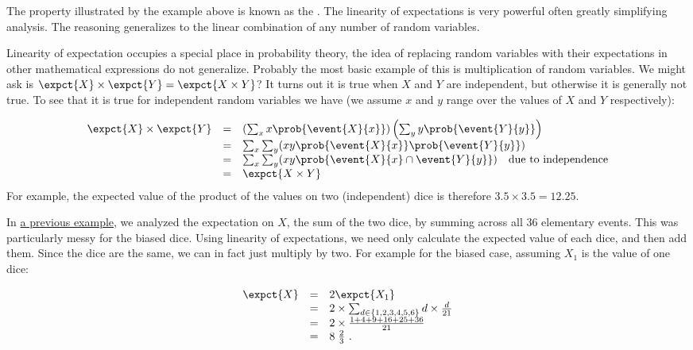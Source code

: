 \begin{flex}
\label{grp:grm:probability::expectation::property}

\begin{gram}
\label{grm:probability::expectation::property}
The property illustrated by the example above is known as the .
The linearity of expectations is very powerful often greatly simplifying
analysis.
The reasoning generalizes to the linear combination of any number of
random variables.

Linearity of expectation occupies a special place in probability
theory, the idea of replacing random variables with their expectations
in other mathematical expressions do not generalize.
Probably the most basic example of this is multiplication of random
variables.
We might ask is $\expct{X} \times \expct{Y} = \expct{X \times
  Y}$?  
It turns out it is true when $X$ and $Y$ are independent, but
otherwise it is generally not true. 
To see that it is true for
independent random variables we have (we assume $x$ and $y$ range over
the values of $X$ and $Y$ respectively):

\[
\begin{array}{lcl}
\expct{X} \times \expct{Y} & = & \left(\sum_{x} x \prob{\event{X}{x}}\right) \left(\sum_{y} y \prob{\event{Y}{y}}\right)\\
 & = & \sum_x \sum_y (x y \prob{\event{X}{x}} \prob{\event{Y}{y}}) \\
 & = & \sum_x \sum_y (x y \prob{\event{X}{x} \cap \event{Y}{y}})~~~\mbox{due to independence} \\
 & = & \expct{X \times Y}
\end{array}
\]
For example, the expected value of the product of the values on two
(independent) dice is therefore $3.5 \times 3.5 = 12.25$.

\end{gram}

\begin{example}
\label{xmpl:probability::expectation::expectation}
In \href{ex:probability::expectation::dice}{a previous example}, we analyzed the expectation on $X$, the sum of the two dice, by summing across all 36 elementary events.  This was particularly messy for the biased dice.  Using
linearity of expectations, we need only calculate the expected value
of each dice, and then add them.  Since the dice are the same, we can
in fact just multiply by two.  For example for the biased case,
assuming $X_1$ is the value of one dice:

\[ 
\begin{array}{lcl}
\expct{X}  & =  & 2 \expct{X_1} 
\\
 & = & 2 \times \sum_{d \in \{1,2,3,4,5,6\}} d \times \frac{d}{21}
\\
 & = & 2 \times \frac{1 + 4 + 9 + 16 + 25 + 36}{21}
\\
 & = & 8 \; \frac{2}{3}~.
\end{array}
\]

\end{example}
\end{flex}


